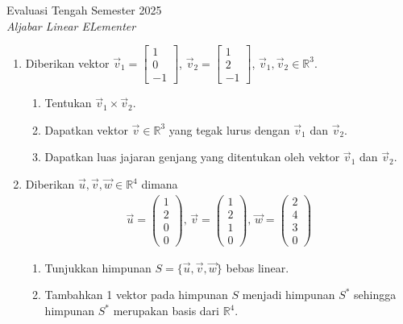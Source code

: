 \documentclass[12pt]{article}
\begin{document}
\begin{center}
    {Evaluasi Tengah Semester 2025} \\
    \textit{Aljabar Linear ELementer} \\
\end{center}

\vspace{0.5cm}

\begin{enumerate}
\item Diberikan vektor $\vec{v}_1 = \begin{bmatrix} 1 \\ 0 \\ -1 \end{bmatrix}$, $\vec{v}_2 = \begin{bmatrix} 1 \\ 2 \\ -1 \end{bmatrix}$, $\vec{v}_1, \vec{v}_2 \in \mathbb{R}^3$.

\begin{enumerate}
\item Tentukan $\vec{v}_1 \times \vec{v}_2$.
\item Dapatkan vektor $\vec{v} \in \mathbb{R}^3$ yang tegak lurus dengan $\vec{v}_1$ dan $\vec{v}_2$.
\item Dapatkan luas jajaran genjang yang ditentukan oleh vektor $\vec{v}_1$ dan $\vec{v}_2$.
\end{enumerate}

\item Diberikan $\vec{u}, \vec{v}, \vec{w} \in \mathbb{R}^4$ dimana
\begin{align*}
\vec{u} = \begin{pmatrix} 1 \\ 2 \\ 0 \\ 0 \end{pmatrix},\, \vec{v} = \begin{pmatrix} 1 \\ 2 \\ 1 \\ 0 \end{pmatrix},\, \vec{w} = \begin{pmatrix} 2 \\ 4 \\ 3 \\ 0 \end{pmatrix}
\end{align*}

\begin{enumerate}
\item Tunjukkan himpunan $S = \{\vec{u}, \vec{v}, \vec{w}\}$ bebas linear.
\item Tambahkan 1 vektor pada himpunan $S$ menjadi himpunan $S^*$ sehingga himpunan $S^*$ merupakan basis dari $\mathbb{R}^4$.
\end{enumerate}


\end{enumerate}
\end{document}
